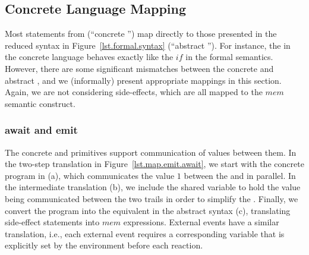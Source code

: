 \subsection{Concrete Language Mapping}

Most statements from \CEU (``concrete \CEU'') map directly to those presented 
in the reduced syntax in Figure~\ref{lst.formal.syntax} (``abstract \CEU'').
For instance, the  in the concrete language behaves exactly like the 
$if$ in the formal semantics.
However, there are some significant mismatches between the concrete and 
abstract \CEU, and we (informally) present appropriate mappings in this 
section.
%
Again, we are not considering side-effects, which are all mapped to the $mem$ 
semantic construct.

\begin{comment}
$
    \code{if}      \mapsto if   ,\2
    \code{';'}     \mapsto ~';' ,\2
    \code{loop}    \mapsto loop ,\2
    \code{par/and} \mapsto and  ,\2
    \code{par/or}  \mapsto or
$.
\end{comment}

\subsubsection{await and emit}

The concrete  and  primitives support communication of 
values between them.
In the two-step translation in Figure~\ref{lst.map.emit.await}, we start with 
the concrete program in \CEU (a), which communicates the value $1$ between the 
 and  in parallel.
In the intermediate translation (b), we include the shared variable  
to hold the value being communicated between the two trails in order to 
simplify the .
Finally, we convert the program into the equivalent in the abstract syntax (c), 
translating side-effect statements into $mem$ expressions.
External events have a similar translation, i.e., each external event requires 
a corresponding variable that is explicitly set by the environment before each 
reaction.

